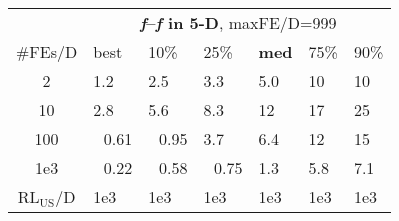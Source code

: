 \begin{tabular}{c|llllll}
 & \multicolumn{6}{|c}{\textbf{\textit{f}\raisebox{-0.35ex}{1}--\textit{f}\raisebox{-0.35ex}{55} in 5-D}, maxFE/D=999}\\
\#FEs/D & best & 10\% & 25\% & \textbf{med} & 75\% & 90\%\\
2 & \hspace*{1ex}1.2 & \hspace*{1ex}2.5 & \hspace*{1ex}3.3 & \hspace*{1ex}5.0 & 10 & 10\\
10 & \hspace*{1ex}2.8 & \hspace*{1ex}5.6 & \hspace*{1ex}8.3 & 12 & 17 & 25\\
100 & ~\,0.61 & ~\,0.95 & \hspace*{1ex}3.7 & \hspace*{1ex}6.4 & 12 & 15\\
1e3 & ~\,0.22 & ~\,0.58 & ~\,0.75 & \hspace*{1ex}1.3 & \hspace*{1ex}5.8 & \hspace*{1ex}7.1\\
$\text{RL}_{\text{US}}$/D & 1e3 & 1e3 & 1e3 & 1e3 & 1e3 & 1e3
\end{tabular}

